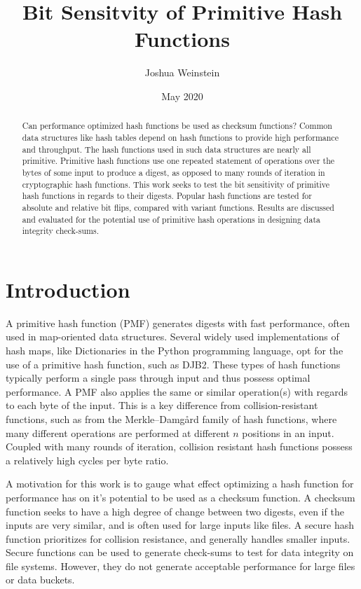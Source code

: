 \documentclass{article}
\title{Bit Sensitvity of Primitive Hash Functions}
\author{Joshua Weinstein}
\affil{Splunk Inc}
\date{May 2020}
\begin{document}
\maketitle

\begin{abstract}
Can performance optimized hash functions be used as checksum functions? Common data structures like hash tables depend on hash functions to provide high performance and throughput. The hash functions used in such data structures are nearly all primitive. Primitive hash functions use one repeated statement of operations over the bytes of some input to produce a digest, as opposed to many rounds of iteration in cryptographic hash functions. This work seeks to test the bit sensitivity of primitive hash functions in regards to their digests. Popular hash functions are tested for absolute and relative bit flips, compared with variant functions. Results are discussed and evaluated for the potential use of primitive hash operations in designing data integrity check-sums. 
\end{abstract}

\section{Introduction}
A primitive hash function (PMF) generates digests with fast performance, often used in map-oriented data structures. Several widely used implementations of hash maps, like Dictionaries\citep{PythonDJB2} in the Python programming language, opt for the use of a primitive hash function, such as DJB2. These types of hash functions typically perform a single pass through input and thus possess optimal performance. A PMF also applies the same or similar operation(s) with regards to each byte of the input. This is a key difference from collision-resistant functions, such as from the Merkle–Damgård family of hash functions, where many different operations are performed at different $n$ positions in an input. Coupled with many rounds of iteration, collision resistant hash functions possess a relatively high cycles per byte ratio\citep{menasce2003security}. 

A motivation for this work is to gauge what effect optimizing a hash function for performance has on it's potential to be used as a checksum function. A checksum function seeks to have a high degree of change between two digests, even if the inputs are very similar, and is often used for large inputs like files. A secure hash function prioritizes for collision resistance, and generally handles smaller inputs. Secure functions can be used to generate check-sums to test for data integrity on file systems\citep{sivathanu2004enhancing}. However, they do not generate acceptable performance for large files or data buckets.
\end{document}
